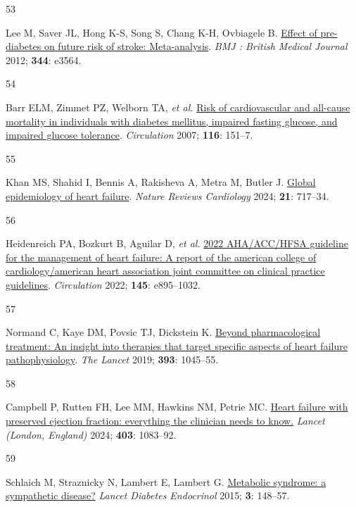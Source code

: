 \documentclass[
  letterpaper,
  headsepline=true,
  open=any]{scrbook}
\newlength{\cslhangindent}
\newlength{\csllabelwidth}
\newlength{\cslentryspacingunit} %
\newenvironment{CSLReferences}[2] %
 {%
  \setlength{\parindent}{0pt}
  \ifodd #1
  \let\oldpar\par
  \def\par{\hangindent=\cslhangindent\oldpar}
  \fi
  \setlength{\parskip}{#2\cslentryspacingunit}
 }%
 {}
\newcommand{\CSLLeftMargin}[1]{\parbox[t]{\csllabelwidth}{#1}}
\newcommand{\CSLRightInline}[1]{\parbox[t]{\linewidth - \csllabelwidth}{#1}\break}
\begin{document}
\begin{CSLReferences}{0}{0}
\leavevmode{}%
\CSLLeftMargin{53 }%
\CSLRightInline{Lee M, Saver JL, Hong K-S, Song S, Chang K-H, Ovbiagele
B. \href{https://doi.org/10.1136/bmj.e3564}{Effect of pre-diabetes on
future risk of stroke: Meta-analysis}. \emph{BMJ : British Medical
Journal} 2012; \textbf{344}: e3564.}

\leavevmode{}%
\CSLLeftMargin{54 }%
\CSLRightInline{Barr ELM, Zimmet PZ, Welborn TA, \emph{et al.}
\href{https://doi.org/10.1161/CIRCULATIONAHA.106.685628}{Risk of
cardiovascular and all-cause mortality in individuals with diabetes
mellitus, impaired fasting glucose, and impaired glucose tolerance}.
\emph{Circulation} 2007; \textbf{116}: 151--7.}

\leavevmode{}%
\CSLLeftMargin{55 }%
\CSLRightInline{Khan MS, Shahid I, Bennis A, Rakisheva A, Metra M,
Butler J. \href{https://doi.org/10.1038/s41569-024-01046-6}{Global
epidemiology of heart failure}. \emph{Nature Reviews Cardiology} 2024;
\textbf{21}: 717--34.}

\leavevmode{}%
\CSLLeftMargin{56 }%
\CSLRightInline{Heidenreich PA, Bozkurt B, Aguilar D, \emph{et al.}
\href{https://doi.org/10.1161/CIR.0000000000001063}{2022 AHA/ACC/HFSA
guideline for the management of heart failure: A report of the american
college of cardiology/american heart association joint committee on
clinical practice guidelines}. \emph{Circulation} 2022; \textbf{145}:
e895--1032.}

\leavevmode{}%
\CSLLeftMargin{57 }%
\CSLRightInline{Normand C, Kaye DM, Povsic TJ, Dickstein K.
\href{https://doi.org/10.1016/S0140-6736(18)32216-5}{Beyond
pharmacological treatment: An insight into therapies that target
specific aspects of heart failure pathophysiology}. \emph{The Lancet}
2019; \textbf{393}: 1045--55.}

\leavevmode{}%
\CSLLeftMargin{58 }%
\CSLRightInline{Campbell P, Rutten FH, Lee MM, Hawkins NM, Petrie MC.
\href{https://doi.org/10.1016/S0140-6736(23)02756-3}{Heart failure with
preserved ejection fraction: everything the clinician needs to know.}
\emph{Lancet (London, England)} 2024; \textbf{403}: 1083--92.}

\leavevmode{}%
\CSLLeftMargin{59 }%
\CSLRightInline{Schlaich M, Straznicky N, Lambert E, Lambert G.
\href{https://doi.org/10.1016/s2213-8587(14)70033-6}{Metabolic syndrome:
a sympathetic disease?} \emph{Lancet Diabetes Endocrinol} 2015;
\textbf{3}: 148--57.}


\end{CSLReferences}
\end{document}
